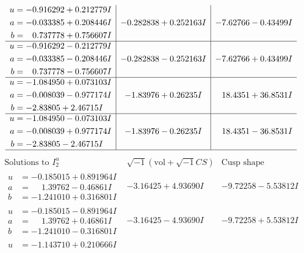 \documentclass[1p]{elsarticle_modified}
\theoremstyle{definition}
\newcommand{\I}{\sqrt{-1}}
\begin{document}
$$\begin{array}{c|c|c}
\begin{aligned}
u &= -0.916292 + 0.212779 I \\
a &= -0.033385 + 0.208446 I \\
b &= \phantom{-}0.737778 + 0.756607 I\end{aligned}
 & -0.282838 + 0.252163 I & -7.62766 - 0.43499 I \\ \hline\begin{aligned}
u &= -0.916292 - 0.212779 I \\
a &= -0.033385 - 0.208446 I \\
b &= \phantom{-}0.737778 - 0.756607 I\end{aligned}
 & -0.282838 - 0.252163 I & -7.62766 + 0.43499 I \\ \hline\begin{aligned}
u &= -1.084950 + 0.073103 I \\
a &= -0.008039 - 0.977174 I \\
b &= -2.83805 + 2.46715 I\end{aligned}
 & -1.83976 + 0.26235 I & \phantom{-}18.4351 + 36.8531 I \\ \hline\begin{aligned}
u &= -1.084950 - 0.073103 I \\
a &= -0.008039 + 0.977174 I \\
b &= -2.83805 - 2.46715 I\end{aligned}
 & -1.83976 - 0.26235 I & \phantom{-}18.4351 - 36.8531 I\\
 \hline 
 \end{array}$$\newpage$$\begin{array}{c|c|c}  
\text{Solutions to }I^u_{2}& \I (\text{vol} + \sqrt{-1}CS) & \text{Cusp shape}\\
 \hline 
\begin{aligned}
u &= -0.185015 + 0.891964 I \\
a &= \phantom{-}1.39762 - 0.46861 I \\
b &= -1.241010 + 0.316801 I\end{aligned}
 & -3.16425 + 4.93690 I & -9.72258 - 5.53812 I \\ \hline\begin{aligned}
u &= -0.185015 - 0.891964 I \\
a &= \phantom{-}1.39762 + 0.46861 I \\
b &= -1.241010 - 0.316801 I\end{aligned}
 & -3.16425 - 4.93690 I & -9.72258 + 5.53812 I \\ \hline\begin{aligned}
u &= -1.143710 + 0.210666 I \\

\end{aligned}
\end{array}$$
\end{document}
